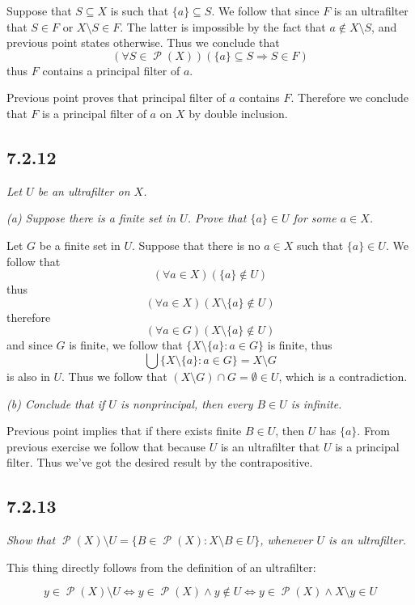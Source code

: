 \documentclass[11pt,oneside,titlepage]{book}
\DeclareMathOperator \pow {\mathcal {P}}
\DeclareMathOperator \lra {\Leftrightarrow}
\DeclareMathOperator \ra {\Rightarrow}
\newcommand{\set}[1]{\{ #1 \}}
\begin{document}
Suppose that $S \subseteq X$ is such that $\set{a} \subseteq S$. We follow that
since $F$ is an ultrafilter that $S \in F$ or $X \setminus S \in F$. The latter is impossible
by the fact that $a \notin X \setminus S$, and previous point states otherwise. Thus we
conclude that
$$(\forall S \in \pow(X))(\set{a} \subseteq S \ra S \in F)$$
thus $F$ contains a principal filter of $a$.

Previous point proves that principal filter of $a$ contains $F$. Therefore we conclude that
$F$ is a principal filter of $a$ on $X$ by double inclusion.

\subsection*{7.2.12}

\textit{Let $U$ be an ultrafilter on $X$.}

\textit{(a) Suppose there is a finite set in $U$. Prove that $\set{a} \in U$ for some
  $a \in X$.}

Let $G$ be a finite set in $U$. Suppose that there is no $a \in X$ such that
$\set{a} \in U$. We follow that
$$(\forall a \in X)(\set{a} \notin U)$$
thus
$$(\forall a \in X)(X \setminus \set{a} \notin U)$$
therefore
$$(\forall a \in G)(X \setminus \set{a} \notin U)$$
and since $G$ is finite, we follow that $\set{X \setminus \set{a}: a \in G}$ is finite,
thus
$$\bigcup{\set{X \setminus \set{a}: a \in G}} = X \setminus G$$
is also in $U$. Thus we follow that $(X \setminus G) \cap G = \emptyset \in U$, which is
a contradiction.

\textit{(b) Conclude that if $U$ is nonprincipal, then every $B \in U$ is infinite.}

Previous point implies that if there exists finite $B \in U$, then $U$ has $\set{a}$.
From previous exercise we follow that because $U$ is an ultrafilter that $U$ is a
principal filter. Thus we've got the desired result by the contrapositive.

\subsection*{7.2.13}

\textit{Show that $\pow(X) \setminus U = \set{B \in \pow(X): X \setminus B \in U}$, whenever
  $U$ is an ultrafilter.}

This thing directly follows from the definition of an ultrafilter:

$$y \in \pow(X) \setminus U \lra y \in \pow(X) \land y \notin U \lra
y \in \pow(X) \land X \setminus y \in U$$
\end{document}
